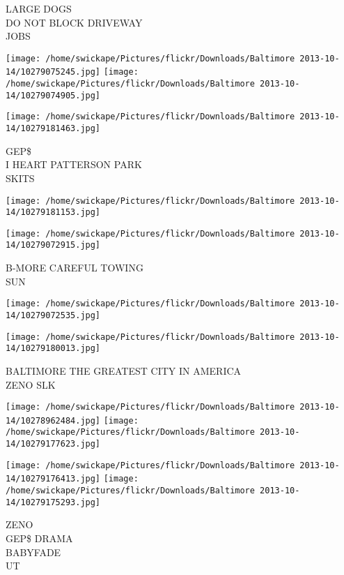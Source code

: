 \documentclass[10pt,letterpaper]{article}
\begin{document}
LARGE DOGS\\
DO NOT BLOCK DRIVEWAY\\
JOBS\\
\pagebreak

\texttt{[image: /home/swickape/Pictures/flickr/Downloads/Baltimore 2013-10-14/10279075245.jpg]}
\texttt{[image: /home/swickape/Pictures/flickr/Downloads/Baltimore 2013-10-14/10279074905.jpg]}

\texttt{[image: /home/swickape/Pictures/flickr/Downloads/Baltimore 2013-10-14/10279181463.jpg]}

GEP\$\\
I HEART PATTERSON PARK\\
SKITS\\
\pagebreak

\texttt{[image: /home/swickape/Pictures/flickr/Downloads/Baltimore 2013-10-14/10279181153.jpg]}

\vspace{0.25in}
\texttt{[image: /home/swickape/Pictures/flickr/Downloads/Baltimore 2013-10-14/10279072915.jpg]}

B{-}MORE CAREFUL TOWING\\
SUN\\
\pagebreak

\texttt{[image: /home/swickape/Pictures/flickr/Downloads/Baltimore 2013-10-14/10279072535.jpg]}

\vspace{0.25in}
\texttt{[image: /home/swickape/Pictures/flickr/Downloads/Baltimore 2013-10-14/10279180013.jpg]}

BALTIMORE THE GREATEST CITY IN AMERICA\\
ZENO SLK\\
\pagebreak

\texttt{[image: /home/swickape/Pictures/flickr/Downloads/Baltimore 2013-10-14/10278962484.jpg]}
\texttt{[image: /home/swickape/Pictures/flickr/Downloads/Baltimore 2013-10-14/10279177623.jpg]}

\texttt{[image: /home/swickape/Pictures/flickr/Downloads/Baltimore 2013-10-14/10279176413.jpg]}
\texttt{[image: /home/swickape/Pictures/flickr/Downloads/Baltimore 2013-10-14/10279175293.jpg]}

ZENO\\
GEP\$ DRAMA\\
BABYFADE\\
UT\\
\pagebreak
\end{document}
